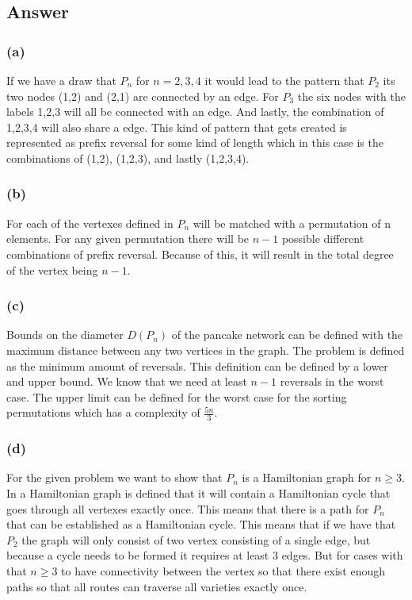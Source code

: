\documentclass{article}
\begin{document}
\subsection*{Answer}
\subsubsection*{(a)}
If we have a draw that $P_n$ for $n = 2, 3, 4$ it would lead to the pattern that $P_2$ its two nodes (1,2) and (2,1) are connected by an edge. For  $P_3$ the six nodes with the labels 1,2,3 will all be connected with an edge. And lastly, the combination of 1,2,3,4 will also share a edge. This kind of pattern that gets created is represented as prefix reversal for some kind of length which in this case is the combinations of (1,2), (1,2,3), and lastly (1,2,3,4).



\subsubsection*{(b)}
For each of the vertexes defined in $P_n$ will be matched with a permutation of n elements. For any given permutation there will be \(n-1\) possible different combinations of prefix reversal. Because of this, it will result in the total degree of the vertex being \(n-1\).


\subsubsection*{(c)}
Bounds on the diameter $D(P_n)$ of the pancake network can be defined with the maximum distance between any two vertices in the graph. The problem is defined as the minimum amount of reversals. This definition can be defined by a lower and upper bound. We know that we need at least \(n-1\) reversals in the worst case. The upper limit can be defined for the worst case for the sorting permutations which has a complexity of \(\frac{5n}{3}\).



\subsubsection*{(d)}
For the given problem we want to show that $P_n$ is a Hamiltonian graph for $n \geq 3$. In a Hamiltonian graph is defined that it will contain a Hamiltonian cycle that goes through all vertexes exactly once. This means that there is a path for $P_n$ that can be established as a Hamiltonian cycle. This means that if we have that $P_2$ the graph will only consist of two vertex consisting of a single edge, but because a cycle needs to be formed it requires at least 3 edges. But for cases with that  $n \geq 3$ to have connectivity between the vertex so that there exist enough paths so that all routes can traverse all varieties exactly once.
\end{document}
